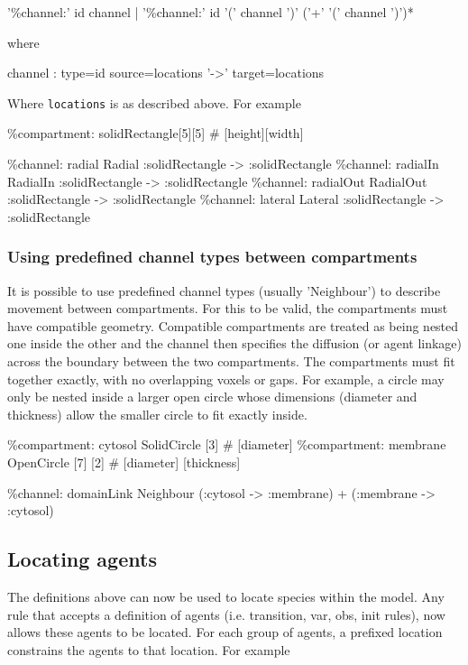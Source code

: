 \begin{bnfsource}
'\%channel:' id channel
| '\%channel:' id '(' channel ')' ('+' '(' channel ')')*
\end{bnfsource}
where
\begin{bnfsource}
channel :
  type=id source=locations '->' target=locations
\end{bnfsource}
Where \verb|locations| is as described above. For example
\begin{kappasource}
\%compartment: solidRectangle[5][5] # [height][width]

\%channel: radial Radial :solidRectangle -> :solidRectangle
\%channel: radialIn RadialIn :solidRectangle -> :solidRectangle
\%channel: radialOut RadialOut :solidRectangle -> :solidRectangle
\%channel: lateral Lateral :solidRectangle -> :solidRectangle
\end{kappasource}

\subsubsection{Using predefined channel types between compartments}

It is possible to use predefined channel types (usually 'Neighbour') to describe movement between compartments. For this to be valid, the compartments must have compatible geometry. Compatible compartments are treated as being nested one inside the other and the channel then specifies the diffusion (or agent linkage) across the boundary between the two compartments. The compartments must fit together exactly, with no overlapping voxels or gaps. For example, a circle may only be nested inside a larger open circle whose dimensions (diameter and thickness) allow the smaller circle to fit exactly inside.

\begin{kappasource}
\%compartment: cytosol   SolidCircle   [3]           # [diameter]
\%compartment: membrane  OpenCircle    [7] [2]       # [diameter] [thickness]

\%channel: domainLink Neighbour (:cytosol -> :membrane) + (:membrane -> :cytosol)
\end{kappasource}


\subsection{Locating agents}

The definitions above can now be used to locate species within the model. Any rule that accepts a definition of agents (i.e. transition, var, obs, init rules), now allows these agents to be located. For each group of agents, a prefixed location constrains the agents to that location. For example

